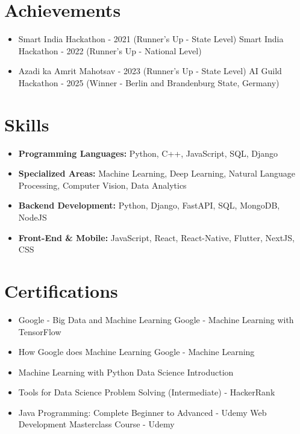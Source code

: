 \documentclass[a4paper,10pt]{article}
\begin{document}
\section*{Achievements}
\begin{itemize}
\item Smart India Hackathon - 2021 (Runner's Up - State Level) \hfill Smart India Hackathon - 2022 (Runner's Up - National Level)
\item Azadi ka Amrit Mahotsav - 2023 (Runner's Up - State Level) \hfill AI Guild Hackathon - 2025 (Winner - Berlin and Brandenburg State, Germany)
\end{itemize}

\section*{Skills}
\begin{itemize}
  \item \textbf{Programming Languages:} Python, C++, JavaScript, SQL, Django
  \item \textbf{Specialized Areas:} Machine Learning, Deep Learning, Natural Language Processing, Computer Vision, Data Analytics
  \item \textbf{Backend Development:} Python, Django, FastAPI, SQL, MongoDB, NodeJS
  \item \textbf{Front-End \& Mobile:} JavaScript, React, React-Native, Flutter, NextJS, CSS
\end{itemize}

\section*{Certifications}
\begin{itemize}
\item Google - Big Data and Machine Learning \hfill Google - Machine Learning with TensorFlow
\item How Google does Machine Learning \hfill Google - Machine Learning
\item Machine Learning with Python \hfill Data Science Introduction
\item Tools for Data Science \hfill Problem Solving (Intermediate) - HackerRank
\item Java Programming: Complete Beginner to Advanced - Udemy \hfill Web Development Masterclass Course - Udemy
\end{itemize}
\end{document}
